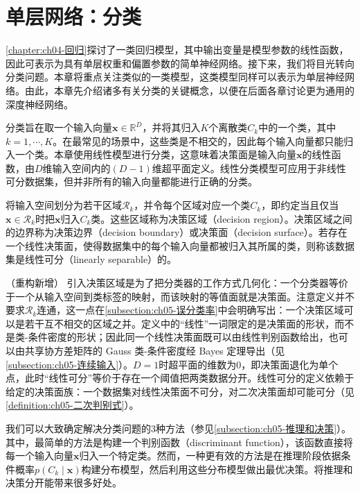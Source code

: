 \documentclass[../main.tex]{subfiles}
\begin{document}
\chapter{单层网络：分类}\label{chapter:ch05-分类}

\cref{chapter:ch04-回归}探讨了一类回归模型，其中输出变量是模型参数的线性函数，因此可表示为具有单层权重和偏置参数的简单神经网络。接下来，我们将目光转向分类问题。本章将重点关注类似的一类模型，这类模型同样可以表示为单层神经网络。由此，本章先介绍诸多有关分类的关键概念，以便在后面各章讨论更为通用的深度神经网络。

分类旨在取一个输入向量$\boldsymbol{x}\in\mathbb{R}^{D}$，并将其归入$K$个离散类$C_k$中的一个类，其中$k=1,\cdots,K$。在最常见的场景中，这些类是不相交的，因此每个输入向量都只能归入一个类。本章使用线性模型进行分类，这意味着决策面是输入向量$\boldsymbol{x}$的线性函数，由$D$维输入空间内的$(D-1)$维超平面定义。线性分类模型可应用于非线性可分数据集，但并非所有的输入向量都能进行正确的分类。

\begin{definition}\label{definition:ch05-决策区域}
将输入空间划分为若干区域$\mathcal{R}_k$，并令每个区域对应一个类$C_k$，即约定当且仅当$\boldsymbol{x}\in\mathcal{R}_k$时把$\boldsymbol{x}$归入$C_k$类。这些区域称为决策区域（decision region）。决策区域之间的边界称为决策边界（decision boundary）或决策面（decision surface）。若存在一个线性决策面，使得数据集中的每个输入向量都被归入其所属的类，则称该数据集是线性可分（linearly separable）的。
\end{definition}

\begin{remark}（重构新增）
引入决策区域是为了把分类器的工作方式几何化：一个分类器等价于一个从输入空间到类标签的映射，而该映射的等值面就是决策面。注意定义并不要求$\mathcal{R}_k$连通，这一点在\cref{subsection:ch05-误分类率}中会明确写出：一个决策区域可以是若干互不相交的区域之并。定义中的“线性”一词限定的是决策面的形状，而不是类-条件密度的形状；因此同一个线性决策面既可以由线性判别函数给出，也可以由共享协方差矩阵的 Gauss 类-条件密度经 Bayes 定理导出（见\cref{subsection:ch05-连续输入}）。$D=1$时超平面的维数为$0$，即决策面退化为单个点，此时“线性可分”等价于存在一个阈值把两类数据分开。线性可分的定义依赖于给定的决策面族：一个数据集对线性决策面不可分，对二次决策面却可能可分（见\cref{definition:ch05-二次判别式}）。
\end{remark}

我们可以大致确定解决分类问题的3种方法（参见\cref{subsection:ch05-推理和决策}）。其中，最简单的方法是构建一个判别函数（discriminant function），该函数直接将每一个输入向量$\boldsymbol{x}$归入一个特定类。然而，一种更有效的方法是在推理阶段依据条件概率$p(C_k\mid\boldsymbol{x})$构建分布模型，然后利用这些分布模型做出最优决策。将推理和决策分开能带来很多好处。
\end{document}
